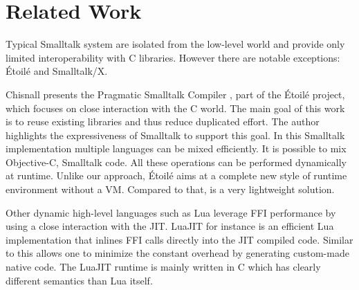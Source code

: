 
\section{Related Work}


Typical Smalltalk system are isolated from the low-level world and provide only limited interoperability with C libraries.
However there are notable exceptions: Étoilé and Smalltalk/X.

Chisnall presents the Pragmatic Smalltalk Compiler \cite{Chis12a}, part of the Étoilé project, which focuses on close interaction with the C world.
The main goal of this work is to reuse existing libraries and thus reduce duplicated effort.
The author highlights the expressiveness of Smalltalk to support this goal.
In this Smalltalk implementation multiple languages can be mixed efficiently.
It is possible to mix Objective-C, Smalltalk code.
All these operations can be performed dynamically at runtime.
Unlike our approach, Étoilé aims at a complete new style of runtime environment without a VM. Compared to that, \NB is a very lightweight solution.


Other dynamic high-level languages such as Lua leverage FFI performance by using a close interaction with the JIT.
LuaJIT \cite{luaffi} for instance is an efficient Lua implementation that inlines FFI calls directly into the JIT compiled code.
Similar to \NB this allows one to minimize the constant overhead by generating custom-made native code.
The LuaJIT runtime is mainly written in C which has clearly different semantics than Lua itself.


